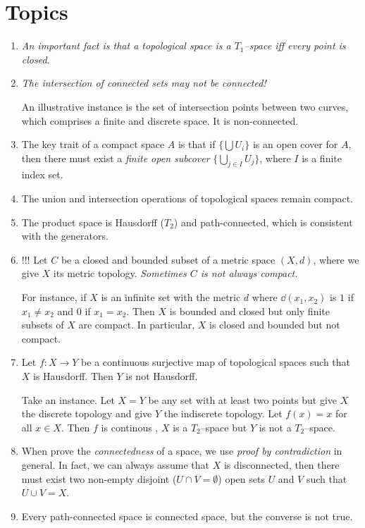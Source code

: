 \documentclass[oneside]{report}
\theoremstyle{mytheoremstyle}
\theoremstyle{mytheoremstyle}
\theoremstyle{myproblemstyle}
\begin{document}
    \section{Topics}
    \begin{enumerate}
        \item \emph{An important fact is that a topological space is a $T_1$--space iff every point is closed.}
        \item \textit{The intersection of connected sets may not be connected!} 
        
        An illustrative instance is the set of intersection points between two curves, which comprises a finite and discrete space. It is  non-connected.
        \item 
        The key trait of a compact space $A$ is that if $\{\bigcup U_i\}$ is an open cover for $A$, then there must exist a \emph{finite open subcover} $\{\bigcup_{j\in I}U_j\}$, where $I$ is a finite index set.
        \item The union and intersection operations of topological spaces remain compact.
        \item The product space is Hausdorff ($T_2$) and path-connected, which is consistent with the generators.
        \item !!! Let $C$ be a closed and bounded subset of a metric space $(X,d)$, where we give $X$ its metric topology. \emph{Sometimes $C$ is not always compact.} 
        
        For instance, if $X$ is an infinite set with the metric $d$ where $\dd(x_1,x_2)$ is $1$ if $x_1\neq x_2$ and $0$ if $x_1=x_2$. Then $X$ is bounded and closed but only finite subsets of $X$ are compact. In particular, $X$ is closed and bounded but not compact.
        \item Let $f\colon X\to Y$ be a continuous surjective map of topological spaces such that $X$ is Hausdorff. Then $Y$ is not Hausdorff.

        Take an instance. Let $X=Y$ be any set with at least two points but give $X$ the discrete topology and give $Y$ the indiscrete topology. Let $f(x)=x$ for all $x\in X$. Then $f$ is continous , $X$ is a $T_2$--space but $Y$ is not a $T_2$--space.
        \item When prove the \emph{connectedness} of a space, we use \textit{proof by contradiction} in general. In fact, we can always assume that $X$ is disconnected, then there must exist two non-empty disjoint ($U\cap V=\emptyset$) open sets $U$ and $V$ such that $U\cup V=X$.
        \item Every path-connected space is connected space, but the converse is not true.
    \end{enumerate}
\end{document}
